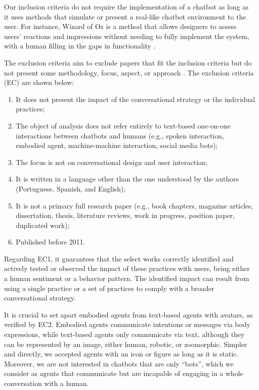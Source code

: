 Our inclusion criteria do not require the implementation of a chatbot as long as it uses methods that simulate or present a real-like chatbot environment to the user. For instance, Wizard of Oz is a method that allows designers to assess users' reactions and impressions without needing to fully implement the system, with a human filling in the gaps in functionality \cite{mitchell2021curtain}. 

The exclusion criteria aim to exclude papers that fit the inclusion criteria but do not present some methodology, focus, aspect, or approach \cite{CostalFFQ21}. The exclusion criteria (EC) are shown below:

\begin{enumerate}
    \item[(EC1)] It does not present the impact of the conversational strategy or the individual practices;
    \item[(EC2)] The object of analysis does not refer entirely to text-based one-on-one interactions between chatbots and humans (e.g., spoken interaction, embodied agent, machine-machine interaction, social media bots);
    \item[(EC3)] The focus is not on conversational design and user interaction;
    \item[(EC4)] It is written in a language other than the one understood by the authors (Portuguese, Spanish, and English);
    \item[(EC5)] It is not a primary full research paper (e.g., book chapters, magazine articles, dissertation, thesis, literature reviews, work in progress, position paper, duplicated work);
    \item[(EC6)] Published before 2011.
\end{enumerate}

Regarding EC1, it guarantees that the select works correctly identified and actively tested or observed the impact of these practices with users, being either a human sentiment or a behavior pattern. The identified impact can result from using a single practice or a set of practices to comply with a broader conversational strategy.

It is crucial to set apart embodied agents from text-based agents with avatars, as verified by EC2. Embodied agents communicate intentions or messages via body expressions, while text-based agents only communicate via text, although they can be represented by an image, either human, robotic, or zoomorphic. Simpler and directly, we accepted agents with an icon or figure as long as it is static. Moreover, we are not interested in chatbots that are only ``bots'', which we consider as agents that communicate but are incapable of engaging in a whole conversation with a human. 

